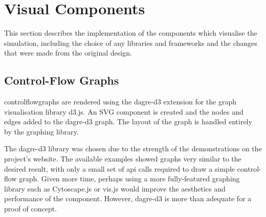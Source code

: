 \documentclass[bsc,twoside,singlespacing,parskip,logo,notimes,normalheadings]{infthesis}
\begin{document}
    \section{Visual Components}
    This section describes the implementation of the components which
    visualise the simulation, including the choice of any libraries
    and frameworks and the changes that were made from the original
    design.

        \subsection{Control-Flow Graphs}  
        \Gls{controlflowgraph}s are rendered using the dagre-d3
        extension for the graph visualisation library d3.js. An SVG
        component is created and the nodes and edges added to the
        dagre-d3 graph. The layout of the graph is handled entirely by
        the graphing library.

        The dagre-d3 library was chosen due to the strength of the
        demonstrations on the project's website\cite{dagre-demos}. The
        available examples showed graphs very similar to the desired
        result, with only a small set of \gls{api} calls required to
        draw a simple control-flow graph. Given more time, perhaps
        using a more fully-featured graphing library such as
        Cytoscape.js \cite{cytoscapejs} or vis.js \cite{vis.js} would
        improve the aesthetics and performance of the
        component. However, dagre-d3 is more than adequate for a proof
        of concept.
\end{document}
